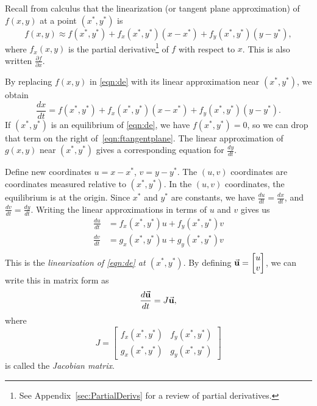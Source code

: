 Recall from calculus
that the linearization (or tangent plane approximation)
of $f(x,y)$ at a point $(x^*,y^*)$ is
\begin{equation}
  f(x,y) \approx f(x^*,y^*)+f_x(x^*,y^*)(x-x^*) + f_y(x^*,y^*)(y-y^*),
\end{equation}
where $f_x(x,y)$ is the partial derivative\footnote{%
See Appendix~\ref{sec:PartialDerivs} for a review
of partial derivatives.}
of $f$ with respect to $x$.
This is also written $\frac{\partial f}{\partial x}$.

By replacing $f(x,y)$ in \eqref{eqn:de}
with its linear approximation near $(x^*,y^*)$,
we obtain
\begin{equation}
   \frac{dx}{dt} = f(x^*,y^*)+f_x(x^*,y^*)(x-x^*) + f_y(x^*,y^*)(y-y^*).
   \label{eqn:ftangentplane}
\end{equation}
If $(x^*,y^*)$ is an equilibrium of \eqref{eqn:de}, we have
$f(x^*,y^*)=0$, so we can drop that term on the right
of~\eqref{eqn:ftangentplane}.
The linear approximation of $g(x,y)$ near $(x^*,y^*)$ gives
a corresponding equation for $\frac{dy}{dt}$.

Define new coordinates $u = x-x^*$, $v = y-y^*$.
The $(u,v)$ coordinates are coordinates measured relative to $(x^*,y^*)$.
In the $(u,v)$ coordinates, the equilibrium is at the origin.
Since $x^*$ and $y^*$ are constants, we have $\frac{du}{dt} = \frac{dx}{dt}$,
and $\frac{dv}{dt} = \frac{dy}{dt}$.  Writing the linear approximations
in terms of $u$ and $v$ gives us
\begin{equation}
\begin{split}
  \frac{du}{dt} & = f_x(x^*,y^*)u + f_y(x^*,y^*)v \\
  \frac{dv}{dt} & = g_x(x^*,y^*)u + g_y(x^*,y^*)v \\
\end{split}
\end{equation}
This is the \emph{linearization of \eqref{eqn:de} at $(x^*,y^*)$}.
By defining $\vec{\textbf{u}} = \begin{bmatrix} u \\ v \end{bmatrix}$, we can write
this in matrix form as
\begin{equation}
  \frac{d\vec{\textbf{u}}}{dt} = J\vec{\textbf{u}},
\label{eqn:linearizedde}
\end{equation}
where
\begin{equation}
   J = \begin{bmatrix}
             f_x(x^*,y^*) & f_y(x^*,y^*) \\
	     g_x(x^*,y^*) & g_y(x^*,y^*)
       \end{bmatrix}
\label{eqn:jac}
\end{equation}
is called the \emph{Jacobian matrix}.

